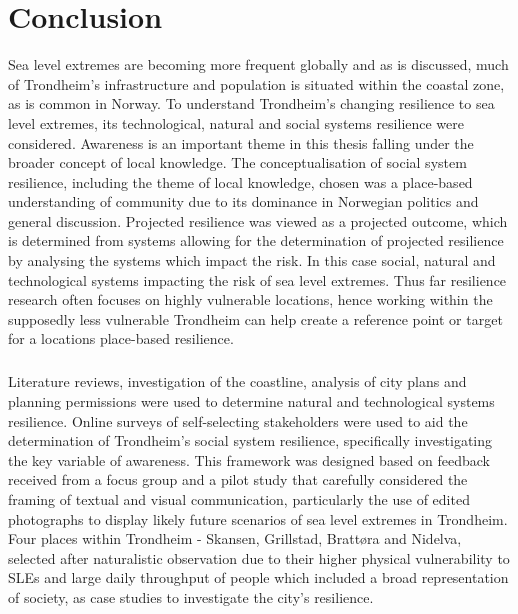


\chapter{Conclusion}

Sea level extremes are becoming more frequent globally and as is discussed, much of Trondheim's infrastructure and population is situated within the coastal zone, as is common in Norway. To understand Trondheim's changing resilience to sea level extremes, its technological, natural and social systems resilience were considered. Awareness is an important theme in this thesis falling under the broader concept of local knowledge. The conceptualisation of social system resilience, including the theme of local knowledge, chosen was a place-based understanding of community due to its dominance in Norwegian politics and general discussion. Projected resilience was viewed as a projected outcome, which is determined from systems allowing for the determination of projected resilience by analysing the systems which impact the risk. In this case social, natural and technological systems impacting the risk of sea level extremes. Thus far resilience research often focuses on highly vulnerable locations, hence working within the supposedly less vulnerable Trondheim can help create a reference point or target for a locations place-based resilience.
\paragraph{}

Literature reviews, investigation of the coastline, analysis of city plans and planning permissions were used to determine natural and technological systems resilience. Online surveys of self-selecting stakeholders were used to aid the determination of Trondheim's social system resilience, specifically investigating the key variable of awareness. This framework was designed based on feedback received from a focus group and a pilot study that carefully considered the framing of textual and visual communication, particularly the use of edited photographs to display likely future scenarios of sea level extremes in Trondheim. Four places within Trondheim - Skansen, Grillstad, Brattøra and Nidelva, selected after naturalistic observation due to their higher physical vulnerability to SLEs and large daily throughput of people which included a broad representation of society, as case studies to investigate the city's resilience.

